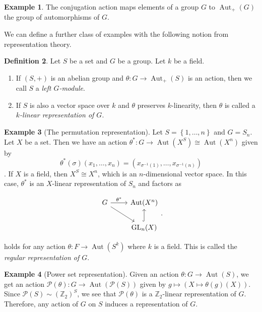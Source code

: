 \documentclass[10pt,letterpaper,cm]{nupset}
\theoremstyle{definition}
\newtheorem{definition}{Definition}[subsection]
\newtheorem{exmp}[definition]{Example}
\theoremstyle{theorem}
\theoremstyle{remark}
\renewcommand{\P}{\mathcal P}
\newcommand{\Z}{\mathbb Z}
\newcommand{\1}{\mathbf{1}}
\newcommand{\0}{\vec 0}
\DeclareMathOperator*{\GL}{GL}
\DeclareMathOperator{\aut}{Aut}
\begin{document}
\smallskip

\begin{exmp}
The conjugation action maps elements of a group $G$ to $\aut_{+}(G)$ the group of automorphisms of $G$.
\end{exmp}

We can define a further class of examples with the following notion from representation theory.

\begin{definition}  Let $S$ be a set and $G$ be a group. Let $k$ be a field.
\begin{enumerate}
\item If $\left(S, +\right)$ is an abelian group and $\theta : G \to \aut_+(S)$ is an action, then we call $S$ a \textit{left $G$-module}.
\item If $S$ is also a vector space over $k$ and $\theta$ preserves $k$-linearity, then $\theta$ is called a \textit{$k$-linear representation of $G$}.
\end{enumerate}
\end{definition}

\medskip

\begin{exmp}[The permutation representation]\label{PR}
Let $S = \left\{1, \ldots, n\right\}$ and $G = S_n$. Let $X$ be a set. Then we have an action $\theta^{\ast} : G\to \aut(X^S) \cong \aut(X^n)$ given by $$\theta^{\ast}(\sigma)(x_1, \ldots, x_n) = \left(x_{\sigma^{-1}(1)}, \ldots, x_{\sigma^{-1}(n)}\right)$$. If $X$ is a field, then $X^S \cong X^n$, which is an $n$-dimensional vector space. In this case, $\theta^\ast$ is an $X$-linear representation of $S_n$ and factors as

\[ \begin{tikzcd}
G \arrow{r}{\theta^{\ast}} \arrow[swap]{dr} & \aut(X^n) \\%
 & \GL_n(X) \arrow[hookrightarrow]{u}
\end{tikzcd}.
\]

\end{exmp}

\smallskip

 holds for any action $\theta: F \to \aut(S^k)$ where $k$ is a field. This is called the \textit{regular representation of $G$}.


\medskip

\begin{exmp}[Power set representation]
Given an action $\theta: G \to \aut(S)$, we get an action $\P(\theta): G \to \aut(\P(S))$ given by $g \mapsto \left(X \mapsto \theta(g)(X)\right)$. Since $\P(S) \sim (\Z_2)^S$, we see that $\P(\theta)$  is a $\Z_2$-linear representation of $G$. Therefore, any action of $G$ on $S$ induces a representation of $G$.
\end{exmp}
\end{document}
